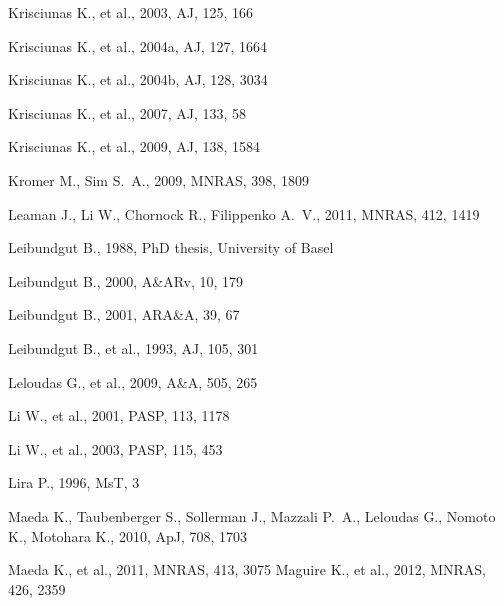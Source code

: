 \begin{thebibliography}{99}
 Krisciunas K., et al., 2003, AJ, 125, 166 

 Krisciunas K., et al., 2004a, AJ, 127, 1664 

 Krisciunas K., et al., 2004b, AJ, 128, 3034 

 Krisciunas K., et al., 2007, AJ, 133, 58 

 Krisciunas K., et al., 2009, AJ, 138, 1584 

 Kromer M., Sim S.~A., 2009, MNRAS,
398, 1809 

Leaman J., Li W., Chornock R., Filippenko A.~V., 2011, MNRAS, 412, 1419 

 Leibundgut B., 1988, PhD thesis, University of Basel

 Leibundgut B., 2000, A\&ARv, 10, 179 

 Leibundgut B., 2001, ARA\&A, 39, 67 

 Leibundgut B., et al., 1993, AJ, 105,
301 

 Leloudas G., et al., 2009, A\&A, 505, 265 

 Li W., et
al., 2001, PASP, 113, 1178 

 Li W., et
al., 2003, PASP, 115, 453 

 Lira P., 
1996, MsT, 3 

Maeda K., Taubenberger S., Sollerman J., Mazzali P.~A., Leloudas G., Nomoto 
K., Motohara K., 2010, ApJ, 708, 1703 

Maeda K., et al., 2011, MNRAS, 413, 3075 
 Maguire K., et al., 2012, MNRAS, 426, 2359 


\end{thebibliography}
